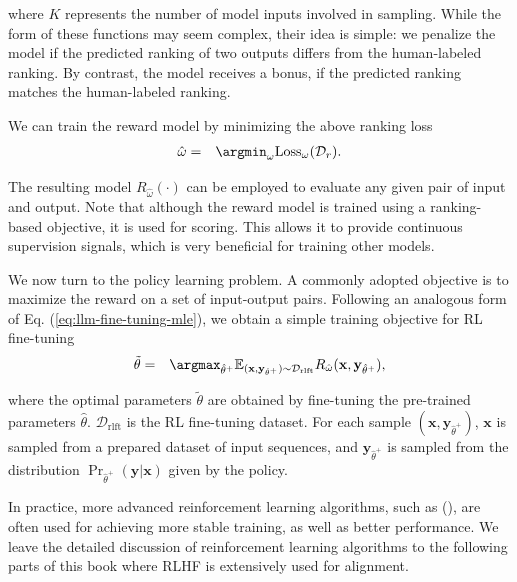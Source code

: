 \noindent where $K$ represents the number of model inputs involved in sampling. While the form of these functions may seem complex, their idea is simple: we penalize the model if the predicted ranking of two outputs differs from the human-labeled ranking. By contrast, the model receives a bonus, if the predicted ranking matches the human-labeled ranking.

We can train the reward model by minimizing the above ranking loss
\begin{eqnarray}
\hat{\omega} & = & \argmin_{\omega} \mathrm{Loss}_{\omega}(\mathcal{D}_r).
\end{eqnarray}


\noindent The resulting model $R_{\hat{\omega}}(\cdot)$ can be employed to evaluate any given pair of input and output. Note that although the reward model is trained using a ranking-based objective, it is used for scoring. This allows it to provide continuous supervision signals, which is very beneficial for training other models.

We now turn to the policy learning problem. A commonly adopted objective is to maximize the reward on a set of input-output pairs. Following an analogous form of Eq. (\ref{eq:llm-fine-tuning-mle}), we obtain a simple training objective for RL fine-tuning
\begin{eqnarray}
\tilde{\theta} & = & \argmax_{\hat{\theta}^+} \mathbb{E}_{(\mathbf{x},\mathbf{y}_{\hat{\theta}^+}) \sim \mathcal{D}_{\mathrm{rlft}}} R_{\hat{\omega}}(\mathbf{x},\mathbf{y}_{\hat{\theta}^+}),
\end{eqnarray}

\noindent where the optimal parameters $\tilde{\theta}$ are obtained by fine-tuning the pre-trained parameters $\hat{\theta}$. $\mathcal{D}_{\mathrm{rlft}}$ is the RL fine-tuning dataset. For each sample $(\mathbf{x},\mathbf{y}_{\hat{\theta}^+})$, $\mathbf{x}$ is sampled from a prepared dataset of input sequences, and $\mathbf{y}_{\hat{\theta}^+}$ is sampled from the distribution $\mathrm{\Pr}_{\hat{\theta}^+}(\mathbf{y}|\mathbf{x})$ given by the policy.

In practice, more advanced reinforcement learning algorithms, such as  (), are often used for achieving more stable training, as well as better performance. We leave the detailed discussion of reinforcement learning algorithms to the following parts of this book where RLHF is extensively used for alignment.

